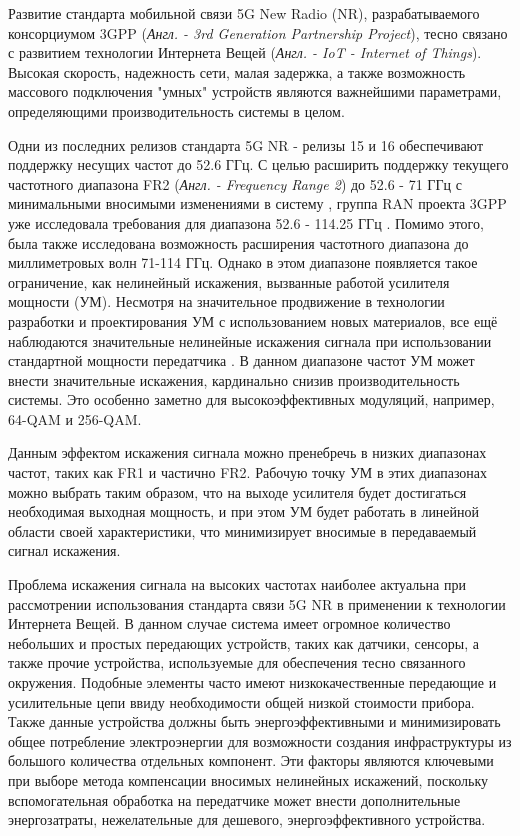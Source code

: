 \documentclass{unn}
\begin{document}
\maketitle
\newpage
\Introduction

Развитие стандарта мобильной связи 5G New Radio (NR), разрабатываемого консорциумом
3GPP (\textit{Англ. - 3rd Generation Partnership Project}), тесно связано с развитием
технологии Интернета Вещей (\textit{Англ. - IoT - Internet of Things}). Высокая скорость,
надежность сети, малая задержка, а также возможность массового подключения
"умных" устройств являются важнейшими параметрами, определяющими
производительность системы в целом.

Одни из последних релизов стандарта 5G NR - релизы 15 и 16 обеспечивают
поддержку несущих частот до 52.6 ГГц. С целью расширить поддержку текущего
частотного диапазона FR2 (\textit{Англ. - Frequency Range 2}) до 52.6 - 71 ГГц с
минимальными вносимыми изменениями в систему \cite{intel193259}
\cite{qlcm193229}, группа RAN проекта 3GPP уже исследовала требования для
диапазона 52.6 - 114.25 ГГц \cite{3gpp.38.807}. Помимо этого, была также
исследована возможность расширения частотного диапазона до миллиметровых
волн 71-114 ГГц. Однако в этом диапазоне появляется такое ограничение, как
нелинейный искажения, вызванные работой усилителя мощности (УМ). Несмотря
на значительное продвижение в технологии разработки и проектирования УМ с
использованием новых материалов, все ещё наблюдаются значительные нелинейные
искажения сигнала при использовании стандартной мощности передатчика
\cite{zhang2021}. В данном диапазоне частот УМ может внести значительные
искажения, кардинально снизив производительность
системы. Это особенно заметно для высокоэффективных модуляций, например,
64-QAM и 256-QAM.

Данным эффектом искажения сигнала можно пренебречь в низких диапазонах
частот, таких как FR1 и частично FR2. Рабочую точку УМ в этих диапазонах
можно выбрать таким образом, что на выходе усилителя будет достигаться
необходимая выходная мощность, и при этом УМ будет работать в линейной
области своей характеристики, что минимизирует вносимые в передаваемый
сигнал искажения.

Проблема искажения сигнала на высоких частотах наиболее актуальна при
рассмотрении использования стандарта связи 5G NR в применении к технологии
Интернета Вещей. В данном случае система имеет огромное количество
небольших и простых передающих устройств, таких как датчики, сенсоры, а
также прочие устройства, используемые для обеспечения тесно
связанного окружения. Подобные элементы часто имеют низкокачественные
передающие и усилительные цепи ввиду необходимости общей низкой стоимости
прибора. Также данные устройства должны быть энергоэффективными и
минимизировать общее потребление электроэнергии для возможности создания
инфраструктуры из большого количества отдельных компонент.
Эти факторы являются ключевыми при выборе метода компенсации вносимых
нелинейных искажений, поскольку вспомогательная обработка на передатчике
может внести дополнительные энергозатраты, нежелательные для дешевого,
энергоэффективного устройства.
\end{document}
